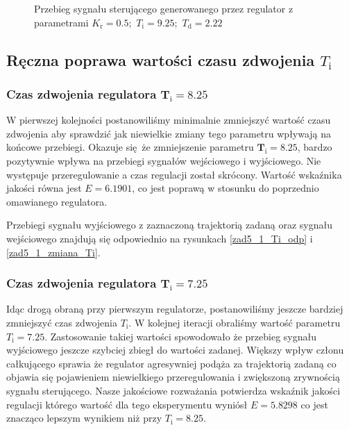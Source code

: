 \begin{figure}[b]
    \centering
    \caption{Przebieg sygnału sterującego generowanego przez regulator z 
    parametrami \mbox{$K_{\mathrm{r}} = \num{0,5}$; $T_{\mathrm{i}} = \num{9,25}$; $T_{\mathrm{d}} = \num{2,22}$}}
    \label{zad5_3_zmiana_K}
\end{figure}
\FloatBarrier

\subsection{Ręczna poprawa wartości czasu zdwojenia $T_{\mathrm{i}}$ }
\label{zad5_poprawa_Ti}

\subsubsection{Czas zdwojenia regulatora $\mathbf{T_{\mathrm{i}}}=\num{8,25}$}
W pierwszej kolejności postanowiliśmy minimalnie zmniejszyć wartość czasu zdwojenia
aby sprawdzić jak niewielkie zmiany tego parametru wpływają na końcowe przebiegi.
Okazuje się że zmniejszenie parametru $\mathbf{T_{\mathrm{i}}}=\num{8,25}$, bardzo
pozytywnie wpływa na przebiegi sygnałów wejściowego i wyjściowego. Nie występuje przeregulowanie
a czas regulacji został skrócony. Wartość wskaźnika jakości równa jest $E = \num{6,1901}$, co jest poprawą
w stosunku do poprzednio omawianego regulatora.

Przebiegi sygnału wyjściowego z zaznaczoną trajektorią zadaną oraz sygnału wejściowego znajdują się 
odpowiednio na rysunkach \ref{zad5_1_Ti_odp} i \ref{zad5_1_zmiana_Ti}.

\subsubsection{Czas zdwojenia regulatora $\mathbf{T_{\mathrm{i}}}=\num{7,25}$}
Idąc drogą obraną przy pierwszym regulatorze, postanowiliśmy jeszcze bardziej zmniejszyć 
czas zdwojenia $T_{\mathrm{i}}$. W kolejnej iteracji obraliśmy wartość parametru
$T_{\mathrm{i}}=\num{7,25}$. Zastosowanie takiej wartości spowodowało że przebieg 
sygnału wyjściowego jeszcze szybciej zbiegł do wartości zadanej. Większy wpływ członu całkującego
sprawia że regulator agresywniej podąża za trajektorią zadaną co objawia się pojawieniem 
niewielkiego przeregulowania i zwiększoną zrywnością sygnału sterującego. Nasze jakościowe 
rozważania potwierdza wskaźnik jakości regulacji którego wartość dla tego eksperymentu
wyniósł $E=\num{5,8298}$ co jest znacząco lepszym wynikiem niż przy $T_{\mathrm{i}}=\num{8,25}$.


